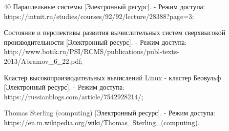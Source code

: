 \documentclass{article}
\begin{document}
\begin{thebibliography} {40}
Параллельные системы [Электронный ресурс].
   - Режим доступа: https://intuit.ru/studies/courses/92/92/lecture/28388?page=3;

Состояние и перспективы развития вычислительных систем сверхвысокой производительности [Электронный ресурс].
   - Режим доступа: http://www.botik.ru/PSI/RCMS/publications/publ-texts-2013/Abramov\_6\_22.pdf;

Кластер высокопроизводительных вычислений Linux - кластер Беовульф [Электронный ресурс].
   - Режим доступа: https://russianblogs.com/article/7542928214/;

Thomas Sterling (computing) [Электронный ресурс].
   - Режим доступа: https://en.m.wikipedia.org/wiki/Thomas\_Sterling\_(computing).

\end{thebibliography}
\end{document}
